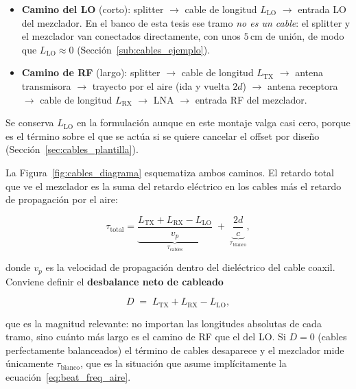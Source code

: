 \documentclass[12pt, a4paper, twoside]{report}
\begin{document}
\begin{itemize}
  \item \textbf{Camino del LO} (corto): splitter $\to$ cable de
    longitud $L_\text{LO}$ $\to$ entrada LO del mezclador. En el banco
    de esta tesis ese tramo \emph{no es un cable}: el splitter y el
    mezclador van conectados directamente, con unos $5\,\text{cm}$ de
    unión, de modo que $L_\text{LO} \approx 0$
    (Sección~\ref{sub:cables_ejemplo}).
  \item \textbf{Camino de RF} (largo): splitter $\to$ cable de longitud
    $L_\text{TX}$ $\to$ antena transmisora $\to$ trayecto por el aire
    (ida y vuelta $2d$) $\to$ antena receptora $\to$ cable de longitud
    $L_\text{RX}$ $\to$ LNA $\to$ entrada RF del mezclador.
\end{itemize}

Se conserva $L_\text{LO}$ en la formulación aunque en este montaje
valga casi cero, porque es el término sobre el que se actúa si se
quiere cancelar el offset por diseño
(Sección~\ref{sec:cables_plantilla}).

La Figura~\ref{fig:cables_diagrama} esquematiza ambos caminos. El
retardo total que ve el mezclador es la suma del retardo eléctrico en
los cables más el retardo de propagación por el aire:

\begin{equation}
  \tau_\text{total} = \underbrace{\frac{L_\text{TX} + L_\text{RX}
  - L_\text{LO}}{v_p}}_{\displaystyle \tau_\text{cables}}
  \;+\; \underbrace{\frac{2d}{c}}_{\displaystyle \tau_\text{blanco}},
  \label{eq:tau_total}
\end{equation}

donde $v_p$ es la velocidad de propagación dentro del dieléctrico del
cable coaxil. Conviene definir el \textbf{desbalance neto de cableado}

\begin{equation}
  D \;=\; L_\text{TX} + L_\text{RX} - L_\text{LO},
  \label{eq:D_neto}
\end{equation}

que es la magnitud relevante: no importan las longitudes absolutas de
cada tramo, sino cuánto más largo es el camino de RF que el del LO. Si
$D = 0$ (cables perfectamente balanceados) el término de cables
desaparece y el mezclador mide únicamente $\tau_\text{blanco}$, que es
la situación que asume implícitamente la
ecuación~\eqref{eq:beat_freq_aire}.
\end{document}
